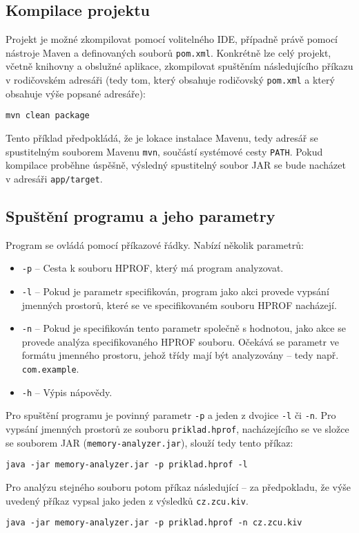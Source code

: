 \subsection{Kompilace projektu}
Projekt je možné zkompilovat pomocí volitelného IDE, případně právě pomocí nástroje Maven a definovaných souborů \texttt{pom.xml}. Konkrétně lze celý projekt, včetně knihovny a obslužné aplikace, zkompilovat spuštěním následujícího příkazu v rodičovském adresáři (tedy tom, který obsahuje rodičovský \texttt{pom.xml} a který obsahuje výše popsané adresáře):

\begin{lstlisting}[frame={single}]
mvn clean package
\end{lstlisting}

Tento příklad předpokládá, že je lokace instalace Mavenu, tedy adresář se spustitelným souborem Mavenu \texttt{mvn}, součástí systémové cesty \texttt{PATH}. Pokud kompilace proběhne úspěšně, výsledný spustitelný soubor JAR se bude nacházet v adresáři \texttt{app/target}.

\subsection{Spuštění programu a jeho parametry}
Program se ovládá pomocí příkazové řádky. Nabízí několik parametrů:

\begin{itemize}
    \item \texttt{-p} -- Cesta k souboru HPROF, který má program analyzovat.
    \item \texttt{-l} -- Pokud je parametr specifikován, program jako akci provede vypsání jmenných prostorů, které se ve specifikovaném souboru HPROF nacházejí.
    \item \texttt{-n} -- Pokud je specifikován tento parametr společně s hodnotou, jako akce se provede analýza specifikovaného HPROF souboru. Očekává se parametr ve formátu jmenného prostoru, jehož třídy mají být analyzovány -- tedy např. \texttt{com.example}.
    \item \texttt{-h} -- Výpis nápovědy.
\end{itemize}

Pro spuštění programu je povinný parametr \texttt{-p} a jeden z dvojice \texttt{-l} či \texttt{-n}. Pro vypsání jmenných prostorů ze souboru \texttt{priklad.hprof}, nacházejícího se ve složce se souborem JAR (\texttt{memory-analyzer.jar}), slouží tedy tento příkaz:

\begin{lstlisting}[frame={single}]
java -jar memory-analyzer.jar -p priklad.hprof -l
\end{lstlisting}

Pro analýzu stejného souboru potom příkaz následující -- za předpokladu, že výše uvedený příkaz vypsal jako jeden z výsledků \texttt{cz.zcu.kiv}.

\begin{lstlisting}[frame={single}]
java -jar memory-analyzer.jar -p priklad.hprof -n cz.zcu.kiv
\end{lstlisting}